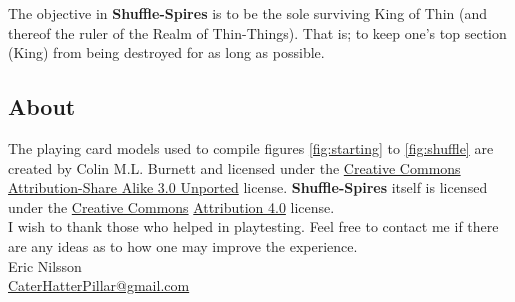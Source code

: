 \documentclass[11pt,twocolumn]{article}
\begin{document}
The objective in \textbf{Shuffle-Spires} is to be the sole surviving King of Thin (and thereof the ruler of the Realm of Thin-Things).
That is; to keep one’s top section (King) from being destroyed for as long as possible.

\subsection{About}
\label{sec:about}
The playing card models used to compile figures \ref{fig:starting} to \ref{fig:shuffle} are created by Colin M.L. Burnett and licensed under the \href{http://en.wikipedia.org/wiki/en:Creative_Commons}{Creative Commons} \href{http://creativecommons.org/licenses/by-sa/3.0/deed.en}{Attribution-Share Alike 3.0 Unported} license.
\textbf{Shuffle-Spires} itself is licensed under the \href{http://en.wikipedia.org/wiki/en:Creative_Commons}{Creative Commons} \href{http://creativecommons.org/licenses/by/4.0/}{Attribution 4.0} license.\\

\noindent
I wish to thank those who helped in playtesting.
Feel free to contact me if there are any ideas as to how one may improve the experience.\\

\noindent
Eric Nilsson \\
\href{mailto:CaterHatterPillar@gmail.com}{CaterHatterPillar@gmail.com}
\end{document}
